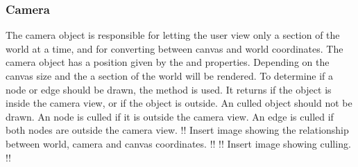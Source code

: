 \subsubsection{Camera}
The camera object is responsible for letting the user view only a section of the world at a time, and for converting between canvas and world coordinates. The camera object has a position given by the  and  properties. Depending on the canvas size and the  a section of the world will be rendered. To determine if a node or edge should be drawn, the  method is used. It returns  if the object is inside the camera view, or  if the object is outside. An culled object should not be drawn. An node is culled if it is outside the camera view. An edge is culled if both nodes are outside the camera view.
!! Insert image showing the relationship between world, camera and canvas coordinates. !!
!! Insert image showing culling. !!